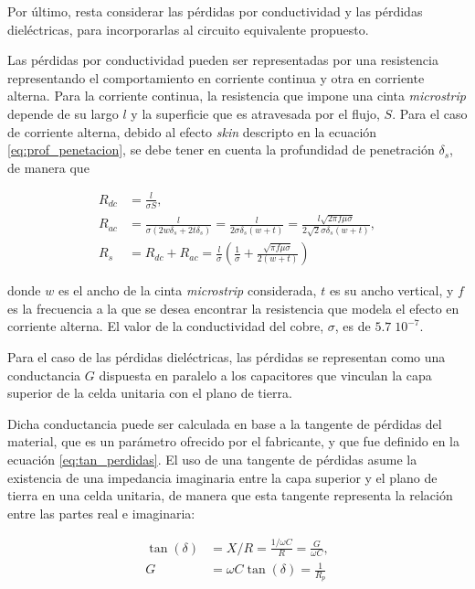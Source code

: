 Por último, resta considerar las pérdidas por conductividad y las pérdidas dieléctricas, para incorporarlas al circuito equivalente propuesto.

Las pérdidas por conductividad pueden ser representadas por una resistencia representando el comportamiento en corriente continua y otra en corriente alterna. Para la corriente continua, la resistencia que impone una cinta \textit{microstrip} depende de su largo $l$ y la superficie que es atravesada por el flujo, $S$. Para el caso de corriente alterna, debido al efecto \textit{skin} descripto en la ecuación \ref{eq:prof_penetacion}, se debe tener en cuenta la profundidad de penetración $\delta_s$, de manera que

\begin{align}
R_{dc} &= \frac{l}{\sigma S}, \\
R_{ac} &= \frac{l}{\sigma(2 w \delta_s+2 t \delta_s)} = \frac{l}{2\sigma \delta_s(w +t)} = \frac{l \sqrt{2 \pi f \mu \sigma}}{2 \sqrt{2}\sigma \delta_s(w +t)}, \\
R_s &= R_{dc} + R_{ac} = \frac{l}{\sigma} (\frac{1}{\sigma} + \frac{\sqrt{\pi f \mu \sigma}}{2 (w+t)})
\end{align}

donde $w$ es el ancho de la cinta \textit{microstrip} considerada, $t$ es su ancho vertical, y $f$ es la frecuencia a la que se desea encontrar la resistencia que modela el efecto en corriente alterna. El valor de la conductividad del cobre, $\sigma$, es de $5.7\;10^{-7}$.

Para el caso de las pérdidas dieléctricas, las pérdidas se representan como una conductancia $G$ dispuesta en paralelo a los capacitores que vinculan la capa superior de la celda unitaria con el plano de tierra.

Dicha conductancia puede ser calculada en base a la tangente de pérdidas del material, que es un parámetro ofrecido por el fabricante, y que fue definido en la ecuación \ref{eq:tan_perdidas}. El uso de una tangente de pérdidas asume la existencia de una impedancia imaginaria entre la capa superior y el plano de tierra en una celda unitaria, de manera que esta tangente representa la relación entre las partes real e imaginaria:

\begin{align}
	\tan(\delta) &= X/R = \frac{1/\omega C}{R} = \frac{G}{\omega C}, \\
	G &= \omega C \tan(\delta) = \frac{1}{R_p}
\end{align}

